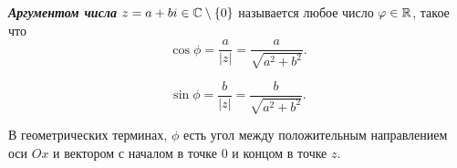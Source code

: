 \begin{definition}
    \textbf{\textit{Аргументом числа}} $z = a + bi \in \mathbb{C} \setminus \{0\}$ называется любое число $\varphi \in \mathbb{R}$, такое что
    \begin{equation*}
        \cos \phi = \frac{a}{|z|} = \frac{a} {\sqrt{a^2 + b^2}}.
    \end{equation*}

    \begin{equation*}
        \sin \phi = \frac{b}{|z|} = \frac{b}{\sqrt{a^2 + b^2}}.
    \end{equation*}

    В геометрических терминах, $\phi$ есть угол между положительным направлением оси $Ox$ и вектором с началом в точке $0$ и концом в точке $z$.
\end{definition}

